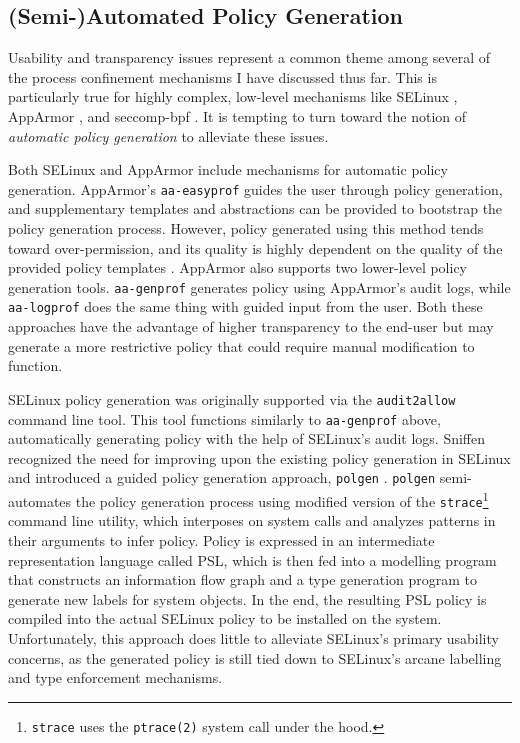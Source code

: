 \documentclass[dvipsnames, 12pt]{article}
\begin{document}
\subsection{(Semi-)Automated Policy Generation}

Usability and transparency issues represent a common theme among several of the
process confinement mechanisms I have discussed thus far. This is particularly
true for highly complex, low-level mechanisms like SELinux
\cite{smalley2001_selinux}, AppArmor \cite{cowan2000_apparmor}, and seccomp-bpf
\cite{drewry2012_seccomp_bpf,seccomp_bpf}. It is tempting to turn toward the
notion of \textit{automatic policy generation} to alleviate these issues.

Both SELinux and AppArmor include mechanisms for automatic policy generation.
AppArmor's \texttt{aa-easyprof} \cite{aa_easyprof} guides the user through
policy generation, and supplementary templates and abstractions can be provided
to bootstrap the policy generation process. However, policy generated using this
method tends toward over-permission, and its quality is highly dependent on the
quality of the provided policy templates \cite{aa_easyprof}.  AppArmor also
supports two lower-level policy generation tools.  \texttt{aa-genprof}
\cite{aa_genprof} generates policy using AppArmor's audit logs, while
\texttt{aa-logprof} \cite{aa_logprof} does the same thing with guided input from
the user. Both these approaches have the advantage of higher transparency to the
end-user but may generate a more restrictive policy that could require manual
modification to function.

SELinux policy generation was originally supported via the \texttt{audit2allow}
\cite{audit2allow} command line tool. This tool functions similarly to
\texttt{aa-genprof} \cite{aa_genprof} above, automatically generating policy
with the help of SELinux's audit logs. Sniffen \etal recognized the need for
improving upon the existing policy generation in SELinux and introduced a guided
policy generation approach, \texttt{polgen} \cite{sniffen06_guided}.
\texttt{polgen} semi-automates the policy generation process using modified
version of the \texttt{strace}\footnote{\texttt{strace} uses the
\texttt{ptrace(2)} system call under the hood.} command line utility, which
interposes on system calls and analyzes patterns in their arguments to infer
policy. Policy is expressed in an intermediate representation language called
PSL, which is then fed into a modelling program that constructs an information
flow graph and a type generation program to generate new labels for system
objects. In the end, the resulting PSL policy is compiled into the actual
SELinux policy to be installed on the system. Unfortunately, this approach does
little to alleviate SELinux's primary usability concerns, as the generated
policy is still tied down to SELinux's arcane labelling and type enforcement
mechanisms.
\end{document}
